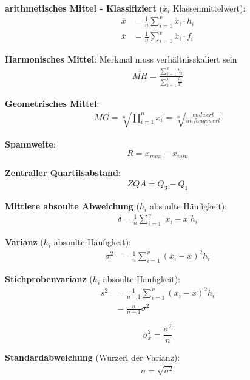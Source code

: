 \documentclass[11pt,twoside,landscape]{article}
\begin{document}
\begin{multicols}{2}
\textbf{arithmetisches Mittel - Klassifiziert} (\(\grave{x_i}\) Klassenmittelwert):
\begin{align*}
\overline{x} &= \frac{1}{n} \sum_{i=1}^v \grave{x_i} \cdot h_i \\
\overline{x} &= \frac{1}{n} \sum_{i=1}^v \grave{x_i} \cdot f_i
\end{align*}

\textbf{Harmonisches Mittel}:
Merkmal muss verhältnisskaliert sein
\begin{align*}
\overline{MH} = \frac{\sum_{i=1}^v h_i}{\sum_{i=1}^v \frac{h_i}{x_i}}
\end{align*}

\textbf{Geometrisches Mittel}:
\begin{align*}
MG = \sqrt[n]{\prod_{i=1}^n x_i} = \sqrt[n]{\frac{endwert}{anfangswert}}
\end{align*}

\textbf{Spannweite}:
\begin{equation*}
  R = x_{max} - x_{min}
\end{equation*}

\textbf{Zentraller Quartilsabstand}:
\begin{align*}
ZQA = Q_3 - Q_1
\end{align*}

\textbf{Mittlere absoulte Abweichung} (\(h_i\) absoulte Häufigkeit):
\begin{align*}
\delta = \frac{1}{n} \sum_{i=1}^{v}|x_i - \overline{x}| h_i
\end{align*}

\textbf{Varianz} (\(h_i\) absoulte Häufigkeit):
\begin{align*}
\sigma^2 &= \frac{1}{n} \sum_{i=1}^{v} (x_i - \overline{x})^2 h_i
\end{align*}

\textbf{Stichprobenvarianz} (\(h_i\) absoulte Häufigkeit):
\begin{align*}
  s^2 &= \frac{1}{n-1} \sum_{i=1}^{v} (x_i - \overline{x})^2 h_i \\
  &= \frac{n}{n-1}\sigma^2
\end{align*}

\begin{equation*}
\sigma_{\overline{x}}^2 = \frac{\sigma^2}{n}
\end{equation*}

\textbf{Standardabweichung} (Wurzerl der Varianz):
\begin{align*}
\sigma = \sqrt{\sigma^2} 
\end{align*}


\end{multicols}
\end{document}
